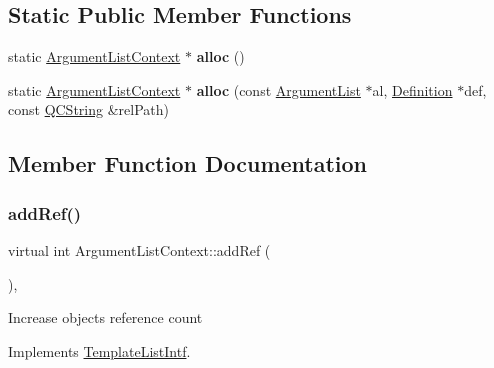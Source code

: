 \subsection*{Static Public Member Functions}
\begin{DoxyCompactItemize}
\item 
\mbox{\label{class_argument_list_context_aab36d7194c922796c443095a484d66c2}} 
static \mbox{\hyperlink{class_argument_list_context}{Argument\+List\+Context}} $\ast$ {\bfseries alloc} ()
\item 
\mbox{\label{class_argument_list_context_a987b4ef7a69ba1297187eca9c9569261}} 
static \mbox{\hyperlink{class_argument_list_context}{Argument\+List\+Context}} $\ast$ {\bfseries alloc} (const \mbox{\hyperlink{class_argument_list}{Argument\+List}} $\ast$al, \mbox{\hyperlink{class_definition}{Definition}} $\ast$def, const \mbox{\hyperlink{class_q_c_string}{Q\+C\+String}} \&rel\+Path)
\end{DoxyCompactItemize}


\subsection{Member Function Documentation}
\mbox{\label{class_argument_list_context_a378c354cf154e3505e9d5a706ceaea55}} 
\subsubsection{\texorpdfstring{addRef()}{addRef()}}
{\footnotesize\ttfamily virtual int Argument\+List\+Context\+::add\+Ref (\begin{DoxyParamCaption}{ }\end{DoxyParamCaption})\hspace{0.3cm}{\ttfamily [inline]}, {\ttfamily [virtual]}}

Increase object\textquotesingle{}s reference count 

Implements \mbox{\hyperlink{class_template_list_intf_a4b4973e2e15396d10bc4e3085462ca2b}{Template\+List\+Intf}}.

\mbox{\label{class_argument_list_context_ac3c4acdd80cab2fcbd53eed215034fe1}} 
